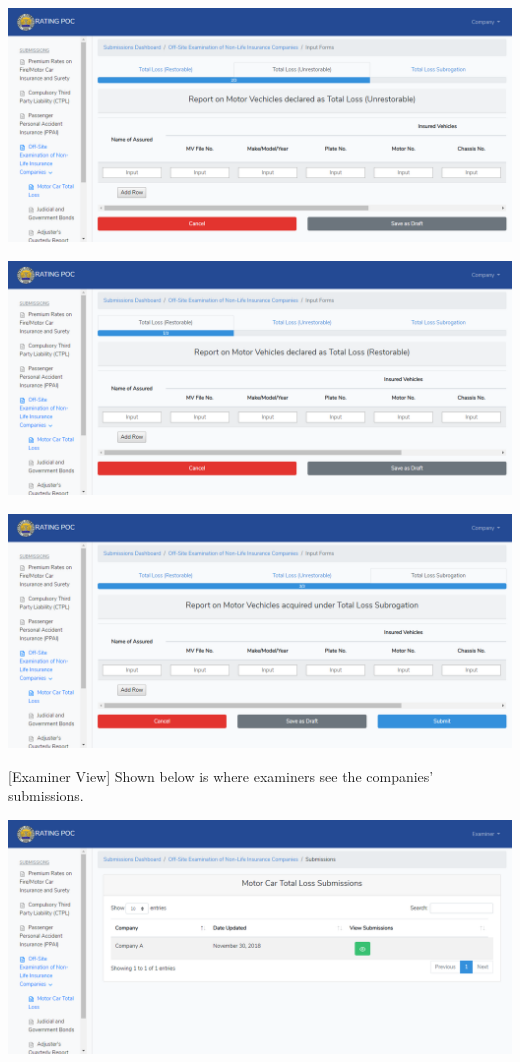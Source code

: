 \documentclass{article}
\begin{document}
\includegraphics[keepaspectratio=true]{up-ic-screens/image156}{}%

\includegraphics[keepaspectratio=true]{up-ic-screens/image77}{}%

\includegraphics[keepaspectratio=true]{up-ic-screens/image210}{}%

[Examiner View] Shown below is where examiners see
the companies’ submissions.%

\includegraphics[keepaspectratio=true]{up-ic-screens/image14}{}%
\end{document}
